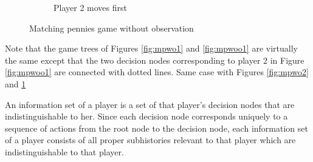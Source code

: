 \begin{exm}
\begin{figure}[h]
\begin{subfigure}{0.45\linewidth}
		            \caption{Player 2 moves first}
		            \label{fig:mpwoo2}
		    \end{subfigure}
		\caption{Matching pennies game without observation}
		\label{fig:mpwoo}
	\end{figure}
	Note that the game trees of Figures \ref{fig:mpwo1} and \ref{fig:mpwoo1} are virtually the same except that the two decision nodes corresponding to player 2 in Figure \ref{fig:mpwoo1} are connected with dotted lines. Same case with Figures \ref{fig:mpwo2} and \ref{fig:mpwoo2}
	\begin{defn}
		An information set of a player is a set of that player's decision nodes that are indistinguishable to her.
		Since each decision node corresponds uniquely to a sequence of actions from the root node to the decision node, each information set of a player consists of all proper subhistories relevant to that player which are indistinguishable to that player. 
	\end{defn}
\end{exm}
